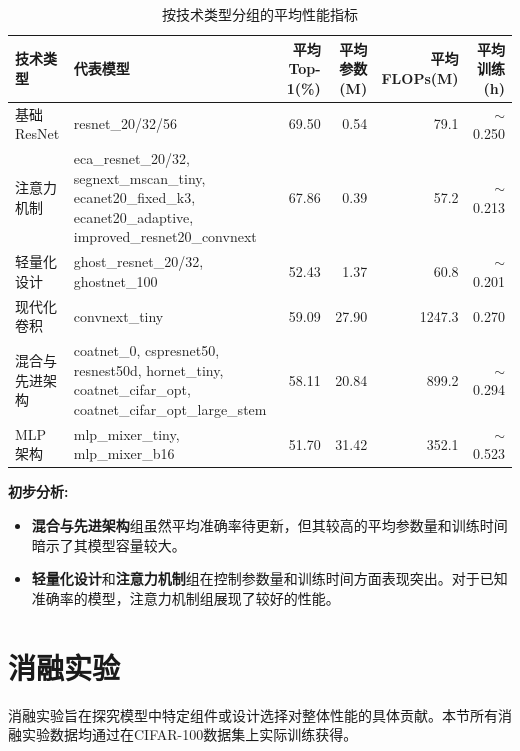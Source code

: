 \documentclass[a4paper]{article}
\begin{document}
\begin{description}
\begin{table}[H]
    \centering
    \caption{按技术类型分组的平均性能指标}
    \label{tab:grouped_performance}
    \begin{tabular}{l|l|r|r|r|r}
        \toprule
        \textbf{技术类型} & \textbf{代表模型} & \textbf{平均Top-1(\%)} & \textbf{平均参数(M)} & \textbf{平均FLOPs(M)} & \textbf{平均训练(h)} \\
        \midrule
        基础ResNet & resnet\_20/32/56 & 69.50 & 0.54 & 79.1 & $\sim$0.250 \\
        \hline
        注意力机制 & \parbox{6cm}{eca\_resnet\_20/32, segnext\_mscan\_tiny, ecanet20\_fixed\_k3, ecanet20\_adaptive, improved\_resnet20\_convnext} & 67.86 & 0.39 & 57.2 & $\sim$0.213 \\
        \hline
        轻量化设计 & ghost\_resnet\_20/32, ghostnet\_100 & 52.43 & 1.37 & 60.8 & $\sim$0.201 \\
        \hline
        现代化卷积 & convnext\_tiny & 59.09 & 27.90 & 1247.3 & 0.270 \\
        \hline
        混合与先进架构 & \parbox{6cm}{coatnet\_0, cspresnet50, resnest50d, hornet\_tiny, coatnet\_cifar\_opt, coatnet\_cifar\_opt\_large\_stem} & 58.11 & 20.84 & 899.2 & $\sim$0.294 \\
        \hline
        MLP架构 & mlp\_mixer\_tiny, mlp\_mixer\_b16 & 51.70 & 31.42 & 352.1 & $\sim$0.523 \\
        \bottomrule
    \end{tabular}
\end{table}

\textbf{初步分析:}
\begin{itemize}
    \item \textbf{混合与先进架构}组虽然平均准确率待更新，但其较高的平均参数量和训练时间暗示了其模型容量较大。
    \item \textbf{轻量化设计}和\textbf{注意力机制}组在控制参数量和训练时间方面表现突出。对于已知准确率的模型，注意力机制组展现了较好的性能。
\end{itemize}

\section{消融实验}
消融实验旨在探究模型中特定组件或设计选择对整体性能的具体贡献。本节所有消融实验数据均通过在CIFAR-100数据集上实际训练获得。


\end{description}
\end{document}
